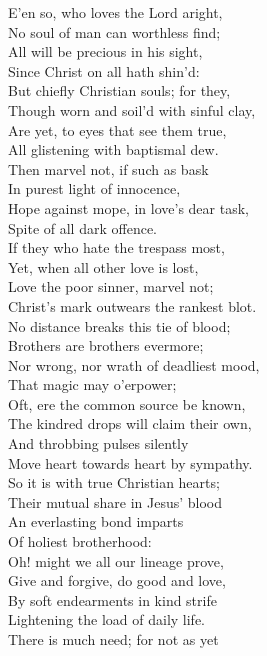   E’en so, who loves the Lord aright, \\
 No soul of man can worthless find; \\
 All will be precious in his sight, \\
 Since Christ on all hath shin’d: \\
 But chiefly Christian souls; for they, \\
 Though worn and soil’d with sinful clay, \\
 Are yet, to eyes that see them true, \\
 All glistening with baptismal dew. \\
  Then marvel not, if such as bask \\
 In purest light of innocence, \\
 Hope against mope, in love’s dear task, \\
 Spite of all dark offence. \\
 If they who hate the trespass most, \\
 Yet, when all other love is lost, \\
 Love the poor sinner, marvel not; \\
 Christ’s mark outwears the rankest blot. \\
  No distance breaks this tie of blood; \\
 Brothers are brothers evermore; \\
 Nor wrong, nor wrath of deadliest mood, \\
 That magic may o’erpower; \\
 Oft, ere the common source be known, \\
 The kindred drops will claim their own, \\
 And throbbing pulses silently \\
 Move heart towards heart by sympathy. \\
  So it is with true Christian hearts; \\
 Their mutual share in Jesus’ blood \\
 An everlasting bond imparts \\
 Of holiest brotherhood: \\
 Oh! might we all our lineage prove, \\
 Give and forgive, do good and love, \\
 By soft endearments in kind strife \\
 Lightening the load of daily life. \\
  There is much need; for not as yet \\
